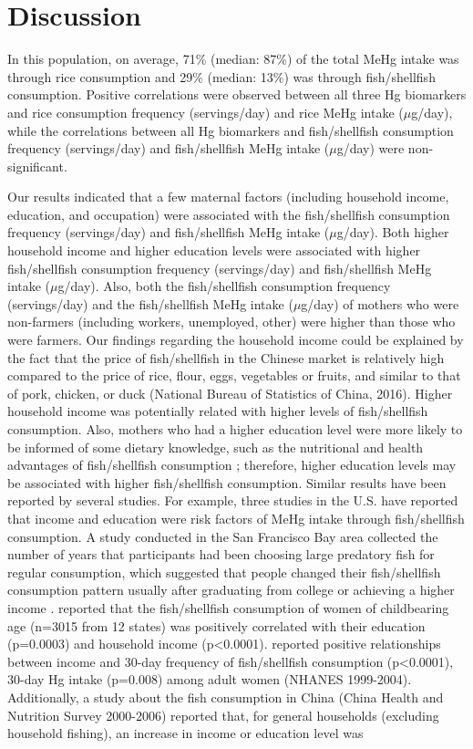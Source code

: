 \section{Discussion} 

In this population, on average, 71\% (median: 87\%) of the total MeHg intake was through rice consumption and 29\% (median: 13\%) was through fish/shellfish consumption. Positive correlations were observed between all three Hg biomarkers and rice consumption frequency (servings/day) and rice MeHg intake (\({\mu}\)g/day), while the correlations between all Hg biomarkers and fish/shellfish consumption frequency (servings/day) and fish/shellfish MeHg intake (\({\mu}\)g/day) were non-significant.

Our results indicated that a few maternal factors (including household income, education, and occupation) were associated with the fish/shellfish consumption frequency (servings/day) and fish/shellfish MeHg intake (\({\mu}\)g/day). Both higher household income and higher education levels were associated with higher fish/shellfish consumption frequency (servings/day) and fish/shellfish MeHg intake (\({\mu}\)g/day). Also, both the fish/shellfish consumption frequency (servings/day) and the fish/shellfish MeHg intake (\({\mu}\)g/day) of mothers who were non-farmers (including workers, unemployed, other) were higher than those who were farmers. Our findings regarding the household income could be explained by the fact that the price of fish/shellfish in the Chinese market is relatively high compared to the price of rice, flour, eggs, vegetables or fruits, and similar to that of pork, chicken, or duck (National Bureau of Statistics of China, 2016). Higher household income was potentially related with higher levels of fish/shellfish consumption. Also, mothers who had a higher education level were more likely to be informed of some dietary knowledge, such as the nutritional and health advantages of fish/shellfish consumption \citep{knobeloch2005fish,wang2009consumers,zhou2015determinants}; therefore, higher education levels may be associated with higher fish/shellfish consumption. Similar results have been reported by several studies. For example, three studies in the U.S. have reported that income and education were risk factors of MeHg intake through fish/shellfish consumption. A study conducted in the San Francisco Bay area collected the number of years that participants had been choosing large predatory fish for regular consumption, which suggested that people changed their fish/shellfish consumption pattern usually after graduating from college or achieving a higher income \cite{hightower2003mercury}. \cite{knobeloch2005fish} reported that the fish/shellfish consumption of women of childbearing age (n=3015 from 12 states) was positively correlated with their education (p=0.0003) and household income (p<0.0001). \cite{mahaffey2009adult} reported positive relationships between income and 30-day frequency of fish/shellfish consumption (p<0.0001), 30-day Hg intake (p=0.008) among adult women (NHANES 1999-2004). Additionally, a study about the fish consumption in China (China Health and Nutrition Survey 2000-2006) reported that, for general households (excluding household fishing), an increase in income or education level was 